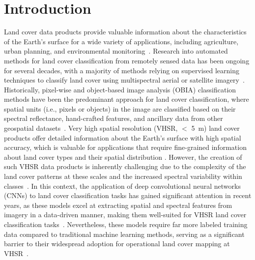 \section{Introduction}\label{sec:introduction}

Land cover data products provide valuable information about the characteristics of the Earth's surface for a wide variety of applications, including agriculture, urban planning, and environmental monitoring~\citep{scarpace1980land, lovelandDevelopmentGlobalLand2000,townshendLandCover1992,wulderLandCover2018,banGlobalLandCover2015}.
Research into automated methods for land cover classification from remotely sensed data has been ongoing for several decades, with a majority of methods relying on supervised learning techniques to classify land cover using multispectral aerial or satellite imagery~\citep{brownLessonsLearnedImplementing2020, brownDynamicWorldRealtime2022, friedlGlobalLandCover2002, friedlMODISCollection52010, zhuContinuousChangeDetection2014}. 
Historically, pixel-wise and object-based image analysis (OBIA) classification methods have been the predominant approach for land cover classification, where spatial units (i.e., pixels or objects) in the image are classified based on their spectral reflectance, hand-crafted features, and ancillary data from other geospatial datasets~\citep{mciverEstimatingPixelscaleLand2001, khatamiMetaanalysisRemoteSensing2016}. 
Very high spatial resolution (VHSR, \(<\) \SI{5}{\meter}) land cover products offer detailed information about the Earth's surface with high spatial accuracy, which is valuable for applications that require fine-grained information about land cover types and their spatial distribution \citep{liImpactsSpatialResolutions2022,fisherImpactSatelliteImagery2018}.
However, the creation of such VHSR data products is inherently challenging due to the complexity of the land cover patterns at these scales and the increased spectral variability within classes~\citep{strahlerNatureModelsRemote1986,woodcockFactorScaleRemote1987,hansenReviewLargeArea2012}.
In this context, the application of deep convolutional neural networks (CNNs) to land cover classification tasks has gained significant attention in recent years, as these models excel at extracting spatial and spectral features from imagery in a data-driven manner, making them well-suited for VHSR land cover classification tasks~\citep{zhuDeepLearningRemote2017a, maDeepLearningRemote2019, valiDeepLearningLand2020}.
Nevertheless, these models require far more labeled training data compared to traditional machine learning methods, serving as a significant barrier to their widespread adoption for operational land cover mapping at VHSR~\citep{zhaoReviewConvolutionalNeural2024, huTransferringDeepConvolutional2015}.

